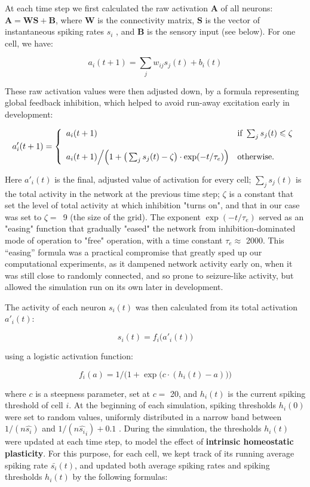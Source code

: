 \documentclass{article}
\begin{document}
At each time step we first calculated the raw activation \textbf{A} of all neurons: $\textbf{A} = \textbf{WS} + \textbf{B}$, where \textbf{W} is the connectivity matrix, \textbf{S} is the vector of instantaneous spiking rates $s_i$ , and \textbf{B} is the sensory input (see below). For one cell, we have:

\[ a_i(t+1) = \sum_j{w_{ij}s_j(t)} + b_i(t) \]

These raw activation values were then adjusted down, by a formula representing global feedback inhibition, which helped to avoid run-away excitation early in development:

\[ a'_i(t+1) = \left \{ \begin{array}{l l} a_i(t+1)
& \text{if } \sum_j{s_j(t)} \leqslant \zeta \\ 
 & \\
a_i(t+1)\Big/ \Big(1 + \big(\sum_j{s_j(t)} - \zeta\big) \cdot \exp(- t/\tau_e)\Big) 
& \text{otherwise.} \end{array} \right. \]

Here $a'_i(t)$ is the final, adjusted value of activation for every cell; $\sum_j{s_j(t)}$ is the total activity in the network at the previous time step; $\zeta$ is a constant that set the level of total activity at which inhibition "turns on", and that in our case was set to \mbox{$\zeta=$ 9} (the size of the grid). The exponent $\exp(-t/\tau_e)$ served as an "easing" function that gradually "eased" the network from inhibition-dominated mode of operation to "free" operation, with a time constant $\tau_e\approx$ 2000. This “easing” formula was a practical compromise that greatly sped up our computational experiments, as it dampened network activity early on, when it was still close to randomly connected, and so prone to seizure-like activity, but allowed the simulation run on its own later in development.

The activity of each neuron $s_i(t)$ was then calculated from its total activation $a'_i(t)$:

\[ s_i(t) = f_i\big(a'_i(t)\big) \]

using a logistic activation function: 

\[ f_i(a) = 1/\Big(1+\exp\big(c\cdot(h_i(t)-a)\big)\Big) \]

where $c$ is a steepness parameter, set at $c=$ 20, and $h_i(t)$ is the current spiking threshold of cell $i$. At the beginning of each simulation, spiking thresholds $h_i(0)$ were set to random values, uniformly distributed in a narrow band between $1/(n \hat{s_i})$ and $1/(n \hat{s_i}_i)+0.1$ . During the simulation, the thresholds $h_i(t)$ were updated at each time step, to model the effect of \textbf{intrinsic homeostatic plasticity}. For this purpose, for each cell, we kept track of its running average spiking rate $\bar{s_i}(t)$, and updated both average spiking rates and spiking thresholds $h_i(t)$ by the following formulas:
\end{document}
